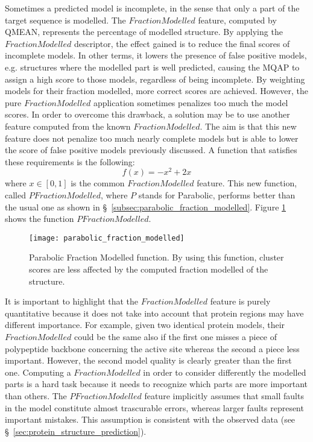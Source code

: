 Sometimes a predicted model is incomplete, in the sense that only a part of the target sequence is modelled. The $FractionModelled$ feature, computed by QMEAN, represents the percentage of modelled structure. By applying the $FractionModelled$ descriptor, the effect gained is to reduce the final scores of incomplete models. In other terms, it lowers the presence of false positive models, e.g. structures where the modelled part is well predicted, causing the MQAP to assign a high score to those models, regardless of being incomplete. By weighting models for their fraction modelled, more correct scores are achieved. However, the pure $FractionModelled$ application sometimes penalizes too much the model scores. In order to overcome this drawback, a solution may be to use another feature computed from the known $FractionModelled$. The aim is that this new feature does not penalize too much nearly complete models but is able to lower the score of false positive models previously discussed. A function that satisfies these requirements is the following:
 \begin{equation}
  	f(x) = -x^2 + 2x
 \end{equation}
where $x \in [0, 1]$ is the common $FractionModelled$ feature. This new function, called $PFractionModelled$, where $P$ stands for Parabolic, performs better than the usual one as shown in \S~\ref{subsec:parabolic_fraction_modelled}. Figure \ref{fig:parabolic_fraction_modelled} shows the function $PFractionModelled$. 
\begin{figure}[tb]
	\begin{center}
		\texttt{[image: parabolic\_fraction\_modelled]}
		\caption[Parabolic Fraction Modelled function]{Parabolic Fraction Modelled function. By using this function, cluster scores are less affected by the computed fraction modelled of the structure.}
		\label{fig:parabolic_fraction_modelled}
	\end{center}
\end{figure}
It is important to highlight that the $FractionModelled$ feature is purely quantitative because it does not take into account that protein regions may have different importance. For example, given two identical protein models, their $FractionModelled$ could be the same also if the first one misses a piece of polypeptide backbone concerning the active site whereas the second a piece less important. However, the second model quality is clearly greater than the first one. Computing a $FractionModelled$ in order to consider differently the modelled parts is a hard task because it needs to recognize which parts are more important than others. The $PFractionModelled$ feature implicitly assumes that small faults in the model constitute almost trascurable errors, whereas larger faults represent important mistakes. This assumption is consistent with the observed data (see \S~\ref{sec:protein_structure_prediction}).\\
